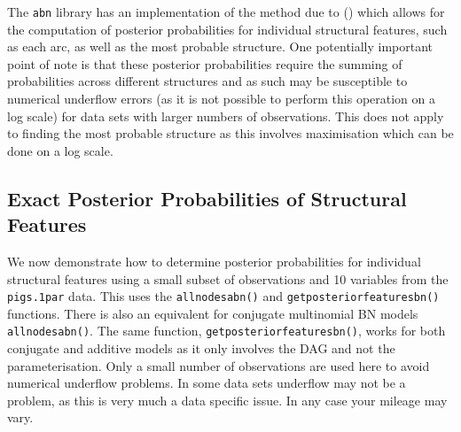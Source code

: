 \documentclass[nojss]{jss}
\begin{document}
The {\tt abn} library has an implementation of the method due to \citeauthor{Koivisto2004} (\citeyear{Koivisto2004}) which allows for the computation of posterior probabilities for individual structural features, such as each arc, as well as the most probable structure. One potentially important point of note is that these posterior probabilities require the summing of probabilities across different structures and as such may be susceptible to numerical underflow errors (as it is not possible to perform this operation on a log scale) for data sets with larger numbers of observations. This does not apply to finding the most probable structure as this involves maximisation which can be done on a log scale. 

\subsection{Exact Posterior Probabilities of Structural Features}
We now demonstrate how to determine posterior probabilities for individual structural features using a small subset of observations and 10 variables from the {\tt pigs.1par} data. This uses the {\tt allnodesabn()} and {\tt getposteriorfeaturesbn()} functions. There is also an equivalent for conjugate multinomial BN models {\tt allnodesabn()}. The same function, {\tt getposteriorfeaturesbn()}, works for both conjugate and additive models as it only involves the DAG and not the parameterisation. Only a small number of observations are used here to avoid numerical underflow problems. In some data sets underflow may not be a problem, as this is very much a data specific issue. In any case your mileage may vary.
\end{document}
